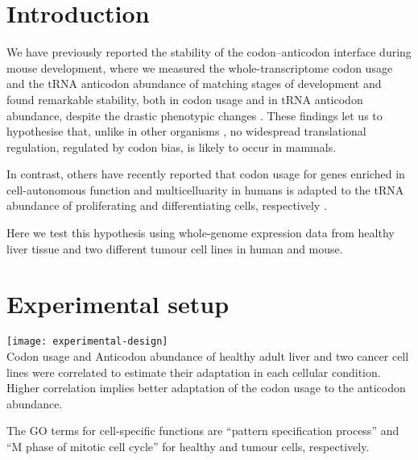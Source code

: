 \documentclass[a0,portrait]{a0poster}
\begin{document}
\noindent
\begin{minipage}[t][][t]{0.48\textwidth}
    \section*{Introduction}
    We have previously reported the stability of the codon--anticodon interface
    during mouse development, where we measured the whole-transcriptome codon
    usage and the tRNA anticodon abundance of matching stages of development and
    found remarkable stability, both in codon usage and in tRNA anticodon
    abundance, despite the drastic phenotypic changes \citep{Schmitt:2014}.
    These findings let us to hypothesise that, unlike in other organisms
    \citep{Carlini:2003}, no widespread translational regulation, regulated by
    codon bias, is likely to occur in mammals.

    In contrast, others have recently reported that codon usage for genes
    enriched in cell-autonomous function and multicelluarity in humans is
    adapted to the tRNA abundance of proliferating and differentiating cells,
    respectively \citep{Gingold:2014}.

    Here we test this hypothesis using whole-genome expression data from healthy
    liver tissue and two different tumour cell lines in human and mouse.
\end{minipage}%
\hfill%
\begin{minipage}[t][][t]{0.48\textwidth}
    \section*{Experimental setup}
    \texttt{[image: experimental-design]}
    \\[1cm]
    Codon usage and Anticodon abundance of healthy adult liver and two
    cancer cell lines were correlated to estimate their adaptation in each
    cellular condition. Higher correlation implies better adaptation of the
    codon usage to the anticodon abundance.

    The GO terms for cell-specific functions are “pattern specification
    process” and “M phase of mitotic cell cycle” for healthy and tumour
    cells, respectively.
\end{minipage}
\end{document}
